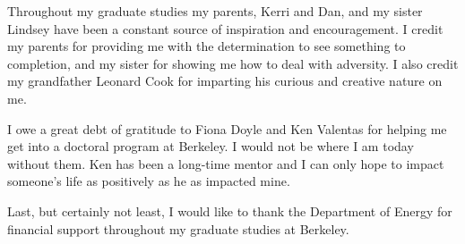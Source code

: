 \documentclass{ucbthesis}
\begin{document}
\begin{frontmatter}
\begin{acknowledgements}
  Throughout my graduate studies my parents, Kerri and Dan, and my sister Lindsey have been a constant source of inspiration and encouragement. I credit my parents for providing me with the determination to see something to completion, and my sister for showing me how to deal with adversity. I also credit my grandfather Leonard Cook for imparting his curious and creative nature on me.

  I owe a great debt of gratitude to Fiona Doyle and Ken Valentas for helping me get into a doctoral program at Berkeley. I would not be where I am today without them. Ken has been a long-time mentor and I can only hope to impact someone’s life as positively as he as impacted mine.

  Last, but certainly not least, I would like to thank the Department of Energy for financial support throughout my graduate studies at Berkeley.

\end{acknowledgements}

\end{frontmatter}

\pagestyle{headings}






%
%

\appendix


\printbibliography
\end{document}
